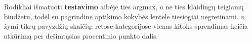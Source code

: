 \vspace{2pt}
\raggedright\scriptsize Rodikliai išmatuoti \textbf{testavimo} aibėje ties argmax, o ne ties klaidingų teigiamų biudžetu, todėl su pagrindine aptikimo kokybės lentele tiesiogiai negretinami. $n$ žymi tikrų pavyzdžių skaičių; retose kategorijose vienas kitoks sprendimas keičia atkūrimą per dešimtąsias procentinio punkto dalis.
\endgroup
